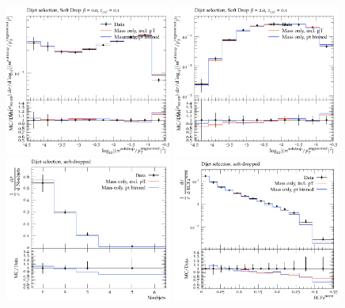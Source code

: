 \begin{figure}
\begin{center}
\includegraphics[width=0.49\textwidth]{figs/RivetPlotsMassOnly/SoftDropMass/d01-x01-y01.pdf} \hfill
\includegraphics[width=0.49\textwidth]{figs/RivetPlotsMassOnly/SoftDropMass/d03-x01-y01.pdf} \hfill
\includegraphics[width=0.49\textwidth]{figs/RivetPlotsMassOnly/ATLAS_2019_I1724098/d23-x01-y01.pdf} \hfill
\includegraphics[width=0.49\textwidth]{figs/RivetPlotsMassOnly/ATLAS_2019_I1724098/d27-x01-y01.pdf} \hfill
\end{center}
\label{massOnlyTune}
\end{figure}


